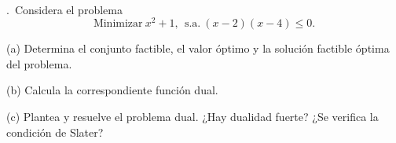 \documentclass[12pt,a4paper,twoside]{article}
\newcounter{problem} \setcounter{problem}{1}
\newcommand{\ex}{\noindent {\sf \bf \theproblem}\addtocounter{problem}{1}.\ }
\begin{document}
\



\ex Considera el problema
\[
\mbox{Minimizar}\ x^2+1,\ \ \mbox{s.a.}\ (x-2)(x-4)\leq 0.
\]
\begin{compactitem}
\item[(a)] Determina el conjunto factible, el valor óptimo y la solución factible óptima del problema.
\item[(b)] Calcula la correspondiente función dual.
\item[(c)] Plantea y resuelve el problema dual. ¿Hay dualidad fuerte? ¿Se verifica la condición de Slater?
\end{compactitem}



\end{document}
